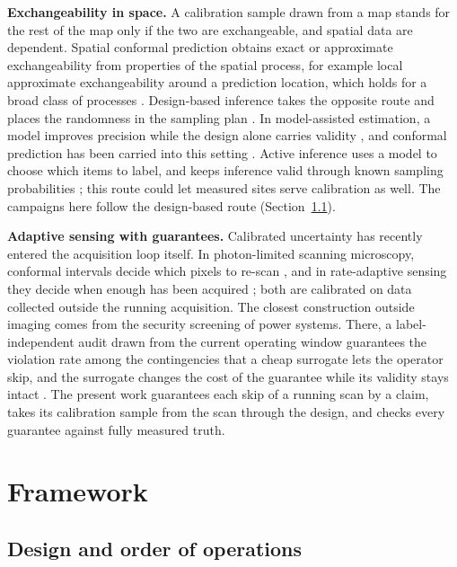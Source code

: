 \documentclass{iopjournal}
\begin{document}
\textbf{Exchangeability in space.} A calibration sample drawn from a map stands for the rest of the map only if the two are exchangeable, and spatial data are dependent. Spatial conformal prediction obtains exact or approximate exchangeability from properties of the spatial process, for example local approximate exchangeability around a prediction location, which holds for a broad class of processes \cite{Mao2024}. Design-based inference takes the opposite route and places the randomness in the sampling plan \cite{Neyman1934,Cochran1977}. In model-assisted estimation, a model improves precision while the design alone carries validity \cite{Sarndal1992}, and conformal prediction has been carried into this setting \cite{Vovk2013,Wieczorek2023}. Active inference uses a model to choose which items to label, and keeps inference valid through known sampling probabilities \cite{ZrnicCandes2024}; this route could let measured sites serve calibration as well. The campaigns here follow the design-based route (Section~\ref{sec:3-1}).

\textbf{Adaptive sensing with guarantees.} Calibrated uncertainty has recently entered the acquisition loop itself. In photon-limited scanning microscopy, conformal intervals decide which pixels to re-scan \cite{Ye2025}, and in rate-adaptive sensing they decide when enough has been acquired \cite{YangZhang2026}; both are calibrated on data collected outside the running acquisition. The closest construction outside imaging comes from the security screening of power systems. There, a label-independent audit drawn from the current operating window guarantees the violation rate among the contingencies that a cheap surrogate lets the operator skip, and the surrogate changes the cost of the guarantee while its validity stays intact \cite{Manoharan2026}. The present work guarantees each skip of a running scan by a claim, takes its calibration sample from the scan through the design, and checks every guarantee against fully measured truth.

\hypertarget{sec:3}{%
\section{Framework}\label{sec:3}}

\hypertarget{sec:3-1}{%
\subsection{Design and order of operations}\label{sec:3-1}}
\end{document}
